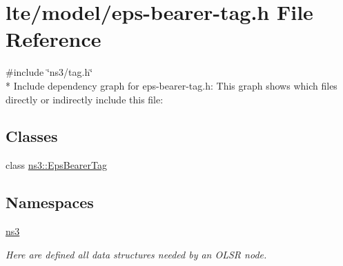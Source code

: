 \hypertarget{eps-bearer-tag_8h}{}\section{lte/model/eps-\/bearer-\/tag.h File Reference}
\label{eps-bearer-tag_8h}
{\ttfamily \#include \char`\"{}ns3/tag.\+h\char`\"{}}\\*
Include dependency graph for eps-\/bearer-\/tag.h\+:
This graph shows which files directly or indirectly include this file\+:
\subsection*{Classes}
\begin{DoxyCompactItemize}
\item 
class \hyperlink{classns3_1_1EpsBearerTag}{ns3\+::\+Eps\+Bearer\+Tag}
\end{DoxyCompactItemize}
\subsection*{Namespaces}
\begin{DoxyCompactItemize}
\item 
 \hyperlink{namespacens3}{ns3}
\begin{DoxyCompactList}\small\item\em Here are defined all data structures needed by an O\+L\+SR node. \end{DoxyCompactList}\end{DoxyCompactItemize}
